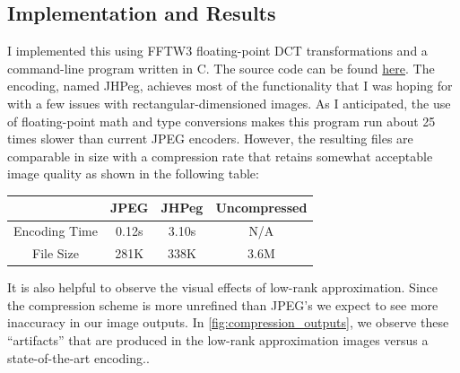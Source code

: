 \documentclass[12pt,technote]{IEEEtran}
\begin{document}
\subsection{Implementation and Results}
I implemented this using FFTW3 floating-point DCT transformations and a command-line program written in C. The source code can be found \href{https://github.com/henry-2025/math189-spectral-compression}{here}. The encoding, named JHPeg, achieves most of the functionality that I was hoping for with a few issues with rectangular-dimensioned images. As I anticipated, the use of floating-point math and type conversions makes this program run about 25 times slower than current JPEG encoders. However, the resulting files are comparable in size with a compression rate that retains somewhat acceptable image quality as shown in the following table:
\begin{center}
    \begin{tabular}{c|c c c}
        & JPEG & JHPeg & Uncompressed\\
        \hline
        Encoding Time & 0.12s & 3.10s & N/A\\
        File Size & 281K & 338K & 3.6M
    \end{tabular}
\end{center}
It is also helpful to observe the visual effects of low-rank approximation. Since the compression scheme is more unrefined than JPEG's we expect to see more inaccuracy in our image outputs. In \ref{fig:compression_outputs}, we observe these ``artifacts'' that are produced in the low-rank approximation images versus a state-of-the-art encoding..
\end{document}
